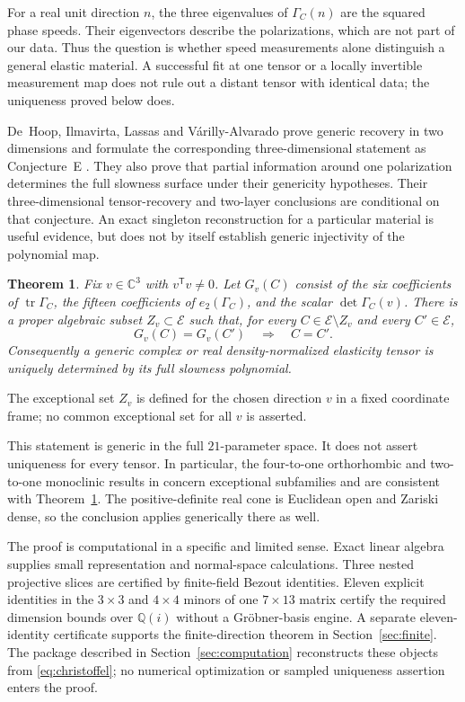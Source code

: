 \documentclass[11pt]{amsart}
\newtheorem{theorem}{Theorem}[section]
\theoremstyle{remark}
\newcommand{\C}{\mathbb C}
\newcommand{\Q}{\mathbb Q}
\newcommand{\E}{\mathcal E}
\newcommand{\tr}{\operatorname{tr}}
\begin{document}
For a real unit direction $n$, the three eigenvalues of $\Gamma_C(n)$ are the squared phase speeds. Their eigenvectors describe the polarizations, which are not part of our data. Thus the question is whether speed measurements alone distinguish a general elastic material. A successful fit at one tensor or a locally invertible measurement map does not rule out a distant tensor with identical data; the uniqueness proved below does.

De~Hoop, Ilmavirta, Lassas and V\'arilly-Alvarado prove generic recovery in two dimensions and formulate the corresponding three-dimensional statement as Conjecture~E \cite{dehoop2025}. They also prove that partial information around one polarization determines the full slowness surface under their genericity hypotheses. Their three-dimensional tensor-recovery and two-layer conclusions are conditional on that conjecture. An exact singleton reconstruction for a particular material is useful evidence, but does not by itself establish generic injectivity of the polynomial map.

\begin{theorem}\label{thm:main}
Fix $v\in\C^3$ with $v^{\mathsf T}v\ne0$. Let $G_v(C)$ consist of the six coefficients of $\tr\Gamma_C$, the fifteen coefficients of $e_2(\Gamma_C)$, and the scalar $\det\Gamma_C(v)$. There is a proper algebraic subset $Z_v\subset\E$ such that, for every $C\in\E\setminus Z_v$ and every $C'\in\E$,
\[
 G_v(C)=G_v(C')\quad\Longrightarrow\quad C=C'.
\]
Consequently a generic complex or real density-normalized elasticity tensor is uniquely determined by its full slowness polynomial.
\end{theorem}

The exceptional set $Z_v$ is defined for the chosen direction $v$ in a fixed coordinate frame; no common exceptional set for all $v$ is asserted.

This statement is generic in the full $21$-parameter space. It does not assert uniqueness for every tensor. In particular, the four-to-one orthorhombic and two-to-one monoclinic results in \cite[Theorem~D]{dehoop2025} concern exceptional subfamilies and are consistent with Theorem~\ref{thm:main}. The positive-definite real cone is Euclidean open and Zariski dense, so the conclusion applies generically there as well.

The proof is computational in a specific and limited sense. Exact linear algebra supplies small representation and normal-space calculations. Three nested projective slices are certified by finite-field Bezout identities. Eleven explicit identities in the $3\times3$ and $4\times4$ minors of one $7\times13$ matrix certify the required dimension bounds over $\Q(i)$ without a Gr\"obner-basis engine. A separate eleven-identity certificate supports the finite-direction theorem in Section~\ref{sec:finite}. The package described in Section~\ref{sec:computation} reconstructs these objects from \eqref{eq:christoffel}; no numerical optimization or sampled uniqueness assertion enters the proof.
\end{document}
